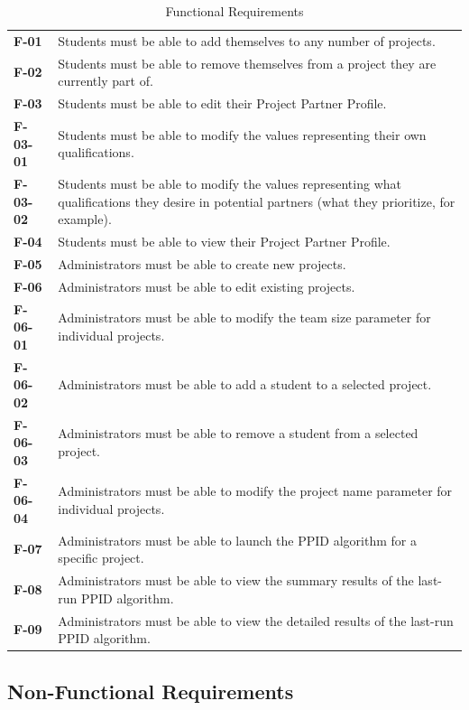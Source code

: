 \documentclass[12pt,letterpaper]{article}
\begin{document}
\begin{table}[H]
	\caption{Functional Requirements}
	\vspace{1em}
	\begin{tabu} to 
		F-01 & Students must be able to add themselves to any number of projects. \\
		F-02 & Students must be able to remove themselves from a project they are currently part of. \\
		F-03 & Students must be able to edit their Project Partner Profile. \\
		\ccindent{}F-03-01 & \ccindent{}Students must be able to modify the values representing their own qualifications. \\
		\ccindent{}F-03-02 & \ccindent{}Students must be able to modify the values representing what qualifications they
		desire in potential partners (what they prioritize, for example). \\
		F-04 & Students must be able to view their Project Partner Profile. \\
		F-05 & Administrators must be able to create new projects. \\
		F-06 & Administrators must be able to edit existing projects. \\
		\ccindent{}F-06-01 & \ccindent{}Administrators must be able to modify the team size parameter for individual projects. \\
		\ccindent{}F-06-02 & \ccindent{}Administrators must be able to add a student to a selected project. \\
		\ccindent{}F-06-03 & \ccindent{}Administrators must be able to remove a student from a selected project. \\
		\ccindent{}F-06-04 & \ccindent{}Administrators must be able to modify the project name parameter for individual projects.\\
		F-07 & Administrators must be able to launch the PPID algorithm for a specific project. \\
		F-08 & Administrators must be able to view the summary results of the last-run PPID algorithm. \\
		F-09 & Administrators must be able to view the detailed results of the last-run PPID algorithm. \\
	\end{tabu}
\end{table}

\subsection{Non-Functional Requirements}
\end{document}
